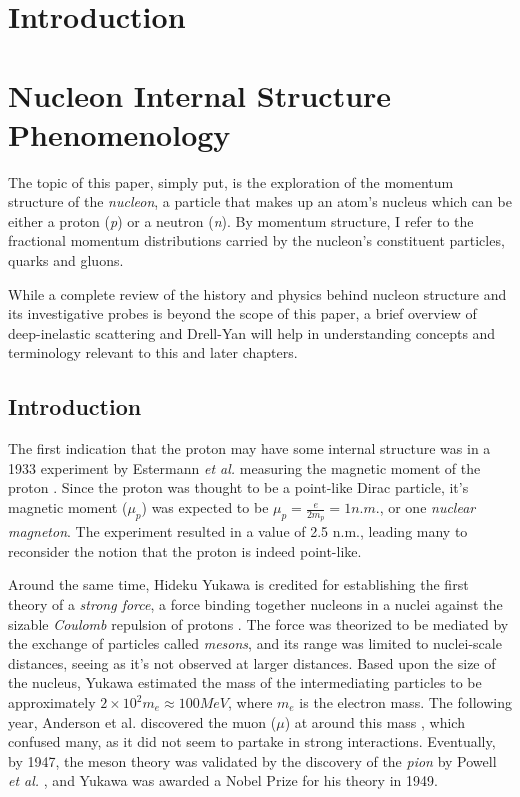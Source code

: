 \chapter{Introduction}

\chapter{Nucleon Internal Structure Phenomenology}

The topic of this paper, simply put, is the exploration of the momentum structure of 
the \emph{nucleon}, a particle that makes up an atom's nucleus which can be either a
proton (\emph{p}) or a neutron (\emph{n}). By momentum structure, I refer to the
fractional momentum distributions carried by the nucleon's constituent particles,
quarks and gluons.

While a complete review of the history and physics behind nucleon structure and its
investigative probes is beyond the scope of this paper, a brief overview of deep-inelastic
scattering and Drell-Yan will help in understanding concepts and terminology relevant to this and later chapters.

\section{Introduction}

The first indication that the proton may have some internal structure was in a
1933 experiment by Estermann \emph{et al.} measuring the magnetic moment of the proton 
\cite{Estermann:169E}. Since the proton was thought to be a point-like Dirac particle, it's 
magnetic moment ($\mu_p$) was expected to be $\mu_p = \frac{e}{2 m_p} = 1 n.m.$, or one \emph{nuclear magneton}. The experiment resulted in a value of 2.5 n.m., leading many
to reconsider the notion that the proton is indeed point-like.

Around the same time, Hideku Yukawa is credited for establishing the first theory
of a \emph{strong force}, a force binding together nucleons in a nuclei against the sizable
\emph{Coulomb} repulsion of protons \cite{}.
The force was theorized to be mediated by the exchange of particles called \emph{mesons}, 
and its range was limited to nuclei-scale distances, seeing as it's not observed at larger distances. Based upon the size of the nucleus, Yukawa estimated the mass of the intermediating particles to be approximately $2 \times 10^2 m_e \approx 100 MeV$, where $m_e$ is the electron mass. 
The following year, Anderson et al. discovered the muon ($\mu$) at around this mass \cite{},
which confused many, as it did not seem to partake in strong interactions. Eventually, by 1947,
the meson theory was validated by the discovery of the \emph{pion} by Powell 
\emph{et al.} \cite{}, and Yukawa was awarded a Nobel Prize for his theory in 1949.


